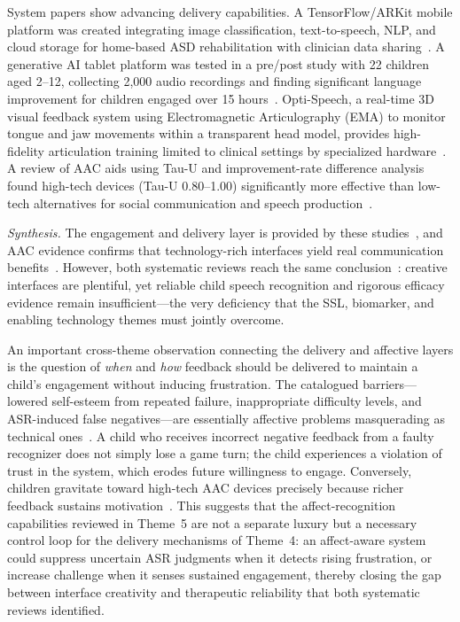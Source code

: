\documentclass[conference]{IEEEtran}
\begin{document}
System papers show advancing delivery capabilities. A TensorFlow/ARKit mobile platform was created integrating image classification, text-to-speech, NLP, and cloud storage for home-based ASD rehabilitation with clinician data sharing~\cite{ref14}. A generative AI tablet platform was tested in a pre/post study with 22 children aged 2--12, collecting 2,000 audio recordings and finding significant language improvement for children engaged over 15 hours~\cite{ref15}. Opti-Speech, a real-time 3D visual feedback system using Electromagnetic Articulography (EMA) to monitor tongue and jaw movements within a transparent head model, provides high-fidelity articulation training limited to clinical settings by specialized hardware~\cite{ref16}. A review of AAC aids using Tau-U and improvement-rate difference analysis found high-tech devices (Tau-U 0.80--1.00) significantly more effective than low-tech alternatives for social communication and speech production~\cite{ref17}.

\emph{Synthesis.} The engagement and delivery layer is provided by these studies~\cite{ref12,ref13,ref14,ref15,ref16,ref17}, and AAC evidence confirms that technology-rich interfaces yield real communication benefits~\cite{ref17}. However, both systematic reviews reach the same conclusion~\cite{ref12,ref13}: creative interfaces are plentiful, yet reliable child speech recognition and rigorous efficacy evidence remain insufficient---the very deficiency that the SSL, biomarker, and enabling technology themes must jointly overcome.

An important cross-theme observation connecting the delivery and affective layers is the question of \emph{when} and \emph{how} feedback should be delivered to maintain a child's engagement without inducing frustration. The catalogued barriers---lowered self-esteem from repeated failure, inappropriate difficulty levels, and ASR-induced false negatives---are essentially affective problems masquerading as technical ones~\cite{ref12}. A child who receives incorrect negative feedback from a faulty recognizer does not simply lose a game turn; the child experiences a violation of trust in the system, which erodes future willingness to engage. Conversely, children gravitate toward high-tech AAC devices precisely because richer feedback sustains motivation~\cite{ref17}. This suggests that the affect-recognition capabilities reviewed in Theme~5 are not a separate luxury but a necessary control loop for the delivery mechanisms of Theme~4: an affect-aware system could suppress uncertain ASR judgments when it detects rising frustration, or increase challenge when it senses sustained engagement, thereby closing the gap between interface creativity and therapeutic reliability that both systematic reviews identified.
\end{document}
